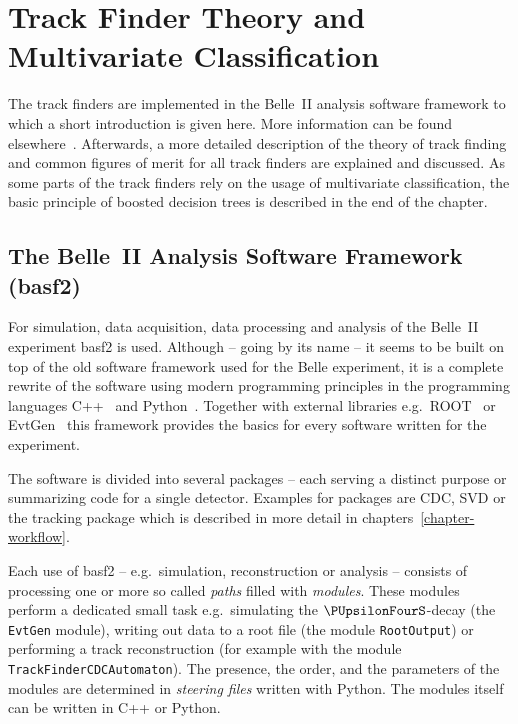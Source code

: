 \chapter{Track Finder Theory and Multivariate Classification} \label{chapter-theory}

The track finders are implemented in the Belle~II analysis software framework to which a short introduction is given here. More information can be found elsewhere~\cite{moll_basf2}. Afterwards, a more detailed description of the theory of track finding and common figures of merit for all track finders are explained and discussed. As some parts of the track finders rely on the usage of multivariate classification, the basic principle of boosted decision trees is described in the end of the chapter.

\section{The Belle~II Analysis Software Framework (basf2)}

For simulation, data acquisition, data processing and analysis of the Belle~II experiment basf2 is used. Although -- going by its name -- it seems to be built on top of the old software framework used for the Belle experiment, it is a complete rewrite of the software using modern programming principles in the programming languages C++~\cite{cpp} and Python~\cite{python}. Together with external libraries e.g.\ ROOT~\cite{root} or EvtGen~\cite{evtgen} this framework provides the basics for every software written for the experiment.

The software is divided into several packages -- each serving a distinct purpose or summarizing code for a single detector. Examples for packages are CDC, SVD or the tracking package which is described in more detail in chapters~\ref{chapter-workflow}.

Each use of basf2 -- e.g.\ simulation, reconstruction or analysis -- consists of processing one or more so called \emph{paths} filled with \emph{modules}. These modules perform a dedicated small task e.g.\ simulating the $\PUpsilonFourS$-decay (the \texttt{EvtGen} module), writing out data to a root file (the module \texttt{RootOutput}) or performing a track reconstruction (for example with the module \texttt{TrackFinderCDCAutomaton}). The presence, the order, and the parameters of the modules are determined in \emph{steering files} written with Python. The modules itself can be written in C++ or Python. 

